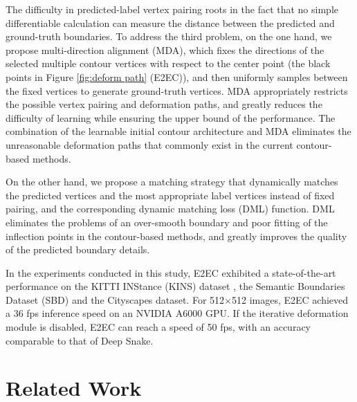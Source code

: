 \documentclass[10pt,twocolumn,letterpaper]{article}
\begin{document}
The difficulty in predicted-label vertex pairing roots in the fact that no simple differentiable calculation can measure the distance between the predicted and ground-truth boundaries. To address the third problem, on the one hand, we propose multi-direction alignment (MDA), which fixes the directions of the selected multiple contour vertices with respect to the center point (the black points in Figure \ref{fig:deform path} (E2EC)), and then uniformly samples between the fixed vertices to generate ground-truth vertices. MDA appropriately restricts the possible vertex pairing and deformation paths, and greatly reduces the difficulty of learning while ensuring the upper bound of the performance. The combination of the learnable initial contour architecture and MDA eliminates the unreasonable deformation paths that commonly exist in the current contour-based methods.

On the other hand, we propose a matching strategy that dynamically matches the predicted vertices and the most appropriate label vertices instead of fixed pairing, and the corresponding dynamic matching loss (DML) function. DML eliminates the problems of an over-smooth boundary and poor fitting of the inflection points in the contour-based methods, and greatly improves the quality of the predicted boundary details. 

In the experiments conducted in this study, E2EC exhibited a state-of-the-art performance on the KITTI INStance (KINS) dataset \cite{kins}, the Semantic Boundaries Dataset (SBD) \cite{sbd} and the Cityscapes \cite{cityscapes} dataset. For 512×512 images, E2EC  achieved a 36 fps inference speed on an NVIDIA A6000 GPU. If the iterative deformation module is disabled, E2EC can reach a speed of 50 fps, with an accuracy comparable to that of Deep Snake.
\section{Related Work}
\label{sec:related work}
\end{document}
